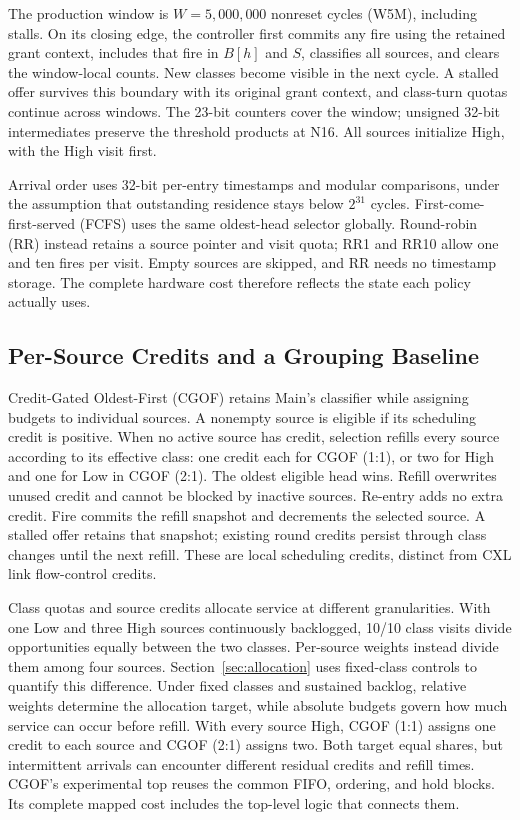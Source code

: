 The production window is $W=5{,}000{,}000$ nonreset cycles (W5M), including stalls. On its closing edge, the controller first commits any fire using the retained grant context, includes that fire in $B[h]$ and $S$, classifies all sources, and clears the window-local counts. New classes become visible in the next cycle. A stalled offer survives this boundary with its original grant context, and class-turn quotas continue across windows. The 23-bit counters cover the window; unsigned 32-bit intermediates preserve the threshold products at N16. All sources initialize High, with the High visit first.

Arrival order uses 32-bit per-entry timestamps and modular comparisons, under the assumption that outstanding residence stays below $2^{31}$ cycles. First-come-first-served (FCFS) uses the same oldest-head selector globally. Round-robin (RR) instead retains a source pointer and visit quota; RR1 and RR10 allow one and ten fires per visit. Empty sources are skipped, and RR needs no timestamp storage. The complete hardware cost therefore reflects the state each policy actually uses.

\subsection{Per-Source Credits and a Grouping Baseline}
Credit-Gated Oldest-First (CGOF) retains Main's classifier while assigning budgets to individual sources. A nonempty source is eligible if its scheduling credit is positive. When no active source has credit, selection refills every source according to its effective class: one credit each for CGOF (1:1), or two for High and one for Low in CGOF (2:1). The oldest eligible head wins. Refill overwrites unused credit and cannot be blocked by inactive sources. Re-entry adds no extra credit. Fire commits the refill snapshot and decrements the selected source. A stalled offer retains that snapshot; existing round credits persist through class changes until the next refill. These are local scheduling credits, distinct from CXL link flow-control credits.

Class quotas and source credits allocate service at different granularities. With one Low and three High sources continuously backlogged, 10/10 class visits divide opportunities equally between the two classes. Per-source weights instead divide them among four sources. Section~\ref{sec:allocation} uses fixed-class controls to quantify this difference. Under fixed classes and sustained backlog, relative weights determine the allocation target, while absolute budgets govern how much service can occur before refill. With every source High, CGOF (1:1) assigns one credit to each source and CGOF (2:1) assigns two. Both target equal shares, but intermittent arrivals can encounter different residual credits and refill times. CGOF's experimental top reuses the common FIFO, ordering, and hold blocks. Its complete mapped cost includes the top-level logic that connects them.

